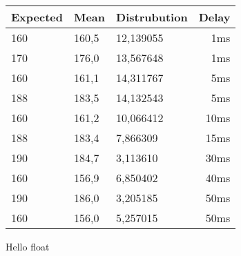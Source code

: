 \begin{float}
    \begin{center}
        \begin{tabular}{ l | l | l | r| }
            Expected&Mean&Distrubution&Delay\\
            \hline
            160&  160,5& 12,139055 & 1ms\\
            170&  176,0& 13,567648 & 1ms\\
            160&  161,1& 14,311767 & 5ms\\
            188&  183,5& 14,132543 & 5ms\\
            160&  161,2& 10,066412 & 10ms\\
            188&  183,4& 7,866309  & 15ms\\
            190&  184,7& 3,113610  & 30ms\\
            160&  156,9& 6,850402  & 40ms\\
            190&  186,0& 3,205185  & 50ms\\
            160&  156,0& 5,257015  & 50ms
        \end{tabular}
    \end{center}
    \caption{Hello float}
\end{float}
